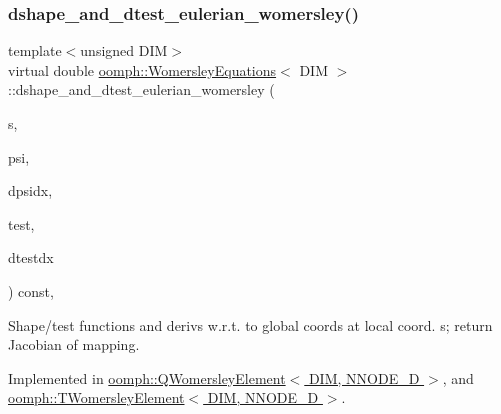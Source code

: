 \mbox{\label{classoomph_1_1WomersleyEquations_a26d31e02c3fb483c76402823e09d67c7}} 
\subsubsection{\texorpdfstring{dshape\+\_\+and\+\_\+dtest\+\_\+eulerian\+\_\+womersley()}{dshape\_and\_dtest\_eulerian\_womersley()}}
{\footnotesize\ttfamily template$<$unsigned D\+IM$>$ \\
virtual double \hyperlink{classoomph_1_1WomersleyEquations}{oomph\+::\+Womersley\+Equations}$<$ D\+IM $>$\+::dshape\+\_\+and\+\_\+dtest\+\_\+eulerian\+\_\+womersley (\begin{DoxyParamCaption}\item[{const \hyperlink{classoomph_1_1Vector}{Vector}$<$ double $>$ \&}]{s,  }\item[{\hyperlink{classoomph_1_1Shape}{Shape} \&}]{psi,  }\item[{\hyperlink{classoomph_1_1DShape}{D\+Shape} \&}]{dpsidx,  }\item[{\hyperlink{classoomph_1_1Shape}{Shape} \&}]{test,  }\item[{\hyperlink{classoomph_1_1DShape}{D\+Shape} \&}]{dtestdx }\end{DoxyParamCaption}) const\hspace{0.3cm}{\ttfamily [protected]}, {}}



Shape/test functions and derivs w.\+r.\+t. to global coords at local coord. s; return Jacobian of mapping. 



Implemented in \hyperlink{classoomph_1_1QWomersleyElement_afe507e9f0d7359d47c0c682fed7c952b}{oomph\+::\+Q\+Womersley\+Element$<$ D\+I\+M, N\+N\+O\+D\+E\+\_\+D $>$}, and \hyperlink{classoomph_1_1TWomersleyElement_a745f06fe3f040dfe800fb09be9f38f1e}{oomph\+::\+T\+Womersley\+Element$<$ D\+I\+M, N\+N\+O\+D\+E\+\_\+D $>$}.

\mbox{\label{classoomph_1_1WomersleyEquations_a6012a6010fc26e347214492f6c590e74}} 
